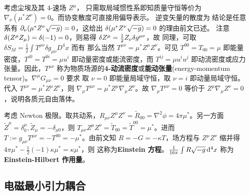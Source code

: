 考虑尘埃及其 4-速场 $Z^\mu$，
只需取局域惯性系即知质量守恒等价为 $\nabla_\nu(\mu^* Z^\nu)=0$。而协变散度可直接用偏导表示。
逆变矢量的散度为
结论是任意系有 $\partial_\nu(\mu^* Z^\nu\sqrt{-g})=0$，这给出 $\var(\mu^* Z^\nu\sqrt{-g})=0$ 的理由前文已述。
注意 $\var(Z^\mu Z_\mu)=\var(-1)=0$，则易得 $\var Z^\mu=\frac 12 Z_\nu \var g^{\mu\nu}$，故
同理，可取 $\delta S_M =\frac{1}{2} \int T^{\mu \nu} \delta g_{\mu \nu} D^4{x}$ 而有
那么当然 $T^{\mu\nu}=\mu^* Z^\mu Z^\nu$。可见 $T^{00}=T_{00}=\mu$ 即能量密度，$T^{i0}=T^{0i}=\mu u^i $ 即动量密度或能流密度，而 $T^{ij}=\mu u^i u^j$ 即动流密度或应力张量。因此，$T^{\mu\nu}$ 称为物质场源的\textbf{4-动流密度}或\textbf{能动张量}(energy-momentum tensor)。$\nabla^{\mu}G_{\mu\nu}=0$ 要求
取 $\nu=0$ 即能量局域守恒，取 $\nu=i$ 即动量局域守恒。代入 $T^{\mu\nu}=\mu^* Z^\mu Z^\nu$，则 $\nabla_\mu T^{\mu\nu}=\mu^* Z^\mu\nabla_\mu Z^\nu$。故 $\nabla_\mu T^{\mu\nu}=0$ 等价于 $Z^\mu\nabla_\mu Z^\nu =0$，说明各质元自由落体。

考虑 Newton 极限。取共动系，$R_{\mu\nu}Z^\mu Z^\nu=\tilde R_{00}=\nabla^2\phi= 4\pi\mu^*$。另一方面 $\tilde Z^\mu=\delta^\mu_0,\tilde Z_\mu=-\delta_{\mu 0}$，则 $T_{\mu\nu}Z^\mu Z^\nu=\tilde T_{00}=\tilde T^{00}=\mu^*$。进而 $T:=g_{\mu\nu}T^{\mu\nu}=-T^{00}=-\mu^*$。由前文知 $R=-G=-\kappa T$，场方程与 $Z^\mu Z^\nu$ 缩并得 $4\pi\mu^*-\frac 12 (-1)\kappa \mu^*=\kappa\mu^*$，则
这称为\textbf{Einstein 方程}。$\frac{1}{16\pi}\int R \sqrt{-g}\dd[4]{x}$ 称为\textbf{Einstein-Hilbert 作用量}。

\subsection{电磁最小引力耦合}

